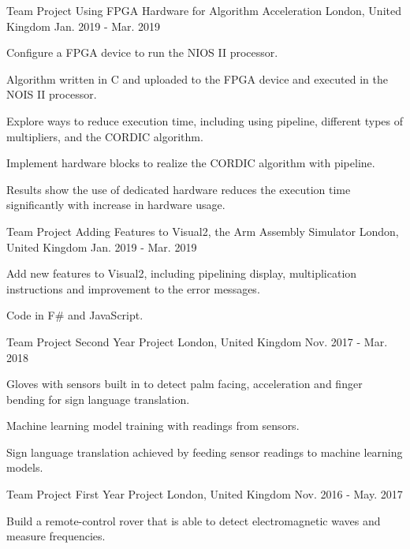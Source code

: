 \begin{cventries}
    \cventry
    {Team Project} %
    {Using FPGA Hardware for Algorithm Acceleration} %
    {London, United Kingdom} %
    {Jan. 2019 - Mar. 2019} %
    {
      \begin{cvitems} %
        \item {Configure a FPGA device to run the NIOS II processor.}
        \item {Algorithm written in C and uploaded to the FPGA device and executed in the NOIS II processor.}
        \item {Explore ways to reduce execution time, including using pipeline, different types of multipliers, and the CORDIC algorithm.}
        \item {Implement hardware blocks to realize the CORDIC algorithm with pipeline.}
        \item {Results show the use of dedicated hardware reduces the execution time significantly with increase in hardware usage.}
      \end{cvitems}
    }
    
    \cventry
    {Team Project} %
    {Adding Features to Visual2, the Arm Assembly Simulator} %
    {London, United Kingdom} %
    {Jan. 2019 - Mar. 2019} %
    {
      \begin{cvitems} %
        \item {Add new features to Visual2, including pipelining display, multiplication instructions and improvement to the error messages.}
        \item {Code in F\# and JavaScript.}
      \end{cvitems}
    }
    
    \cventry
    {Team Project} %
    {Second Year Project} %
    {London, United Kingdom} %
    {Nov. 2017 - Mar. 2018} %
    {
      \begin{cvitems} %
        \item {Gloves with sensors built in to detect palm facing, acceleration and finger bending for sign language translation.}
        \item {Machine learning model training with readings from sensors.}
        \item {Sign language translation achieved by feeding sensor readings to machine learning models.}
      \end{cvitems}
    }
    
    \cventry
    {Team Project} %
    {First Year Project} %
    {London, United Kingdom} %
    {Nov. 2016 - May. 2017} %
    {
      \begin{cvitems} %
        \item {Build a remote-control rover that is able to detect electromagnetic waves and measure frequencies.}
      \end{cvitems}
    }

\end{cventries}